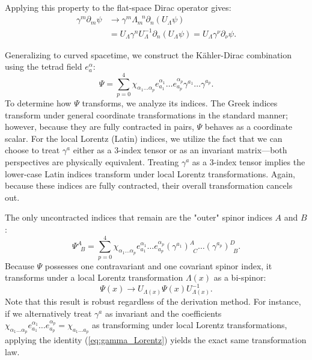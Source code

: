Applying this property to the flat-space Dirac operator gives:
\begin{equation}
\begin{aligned}
    \gamma^{m}\partial_{m}\psi &\to\gamma^{m}\Lambda_{m}^{\;\;\,n}\partial_{n}(U_{\Lambda}\psi) \nonumber\\
   &= U_{\Lambda}\gamma^{n}U_{\Lambda}^{-1}\partial_{n} (U_{\Lambda}\psi)\nonumber
  = U_{\Lambda}\gamma^{\nu}\partial_{\nu}\psi.
\end{aligned}
\end{equation}
 
Generalizing to curved spacetime, we construct the Kähler-Dirac combination using the tetrad field $e^{\alpha}_{a}$:
 \begin{equation}
   \Psi=\sum_{p=0}^{4}\chi_{\alpha_1\ldots\alpha_p}e^{\alpha_1}_{a_1}\ldots e^{\alpha_p}_{a_p}\gamma^{a_1}\ldots\gamma^{a_p}.
 \end{equation}
To determine how $\Psi$ transforms, we analyze its indices. The Greek indices transform under general coordinate transformations in the standard manner; however, because they are fully contracted in pairs, $\Psi$ behaves as a coordinate scalar. For the local Lorentz (Latin) indices, we utilize the fact that we can choose to treat $\gamma^{a}$ either as a 3-index tensor or as an invariant matrix—both perspectives are physically equivalent. Treating $\gamma^{a}$ as a 3-index tensor implies the lower-case Latin indices transform under local Lorentz transformations. Again, because these indices are fully contracted, their overall transformation cancels out. 

The only uncontracted indices that remain are the "outer" spinor indices $A$ and $B$:
\begin{equation}
   \Psi^{A}_{\;\;B}=\sum_{p=0}^{4}\chi_{\alpha_1\ldots\alpha_p}e^{\alpha_1}_{a_1}\ldots e^{\alpha_p}_{a_p}
   (\gamma^{a_1})^{A}_{\;\;C}\ldots
   (\gamma^{a_p})^{D}_{\;\;B}.
\end{equation}
Because $\Psi$ possesses one contravariant and one covariant spinor index, it transforms under a local Lorentz transformation $\Lambda(x)$ as a bi-spinor:
\begin{equation}
  \label{eq:Psi_Lorentz}
  \Psi(x)\to U_{\Lambda(x)}\Psi(x) U_{\Lambda(x)}^{-1}.
\end{equation}
Note that this result is robust regardless of the derivation method. For instance, if we alternatively treat $\gamma^{a}$ as invariant and the coefficients $\chi_{\alpha_1\ldots\alpha_p}e^{\alpha_1}_{a_1}\ldots e^{\alpha_p}_{a_p}=\chi_{a_1\ldots a_p}$ as transforming under local Lorentz transformations, applying the identity (\cref{eq:gamma_Lorentz}) yields the exact same transformation law.

